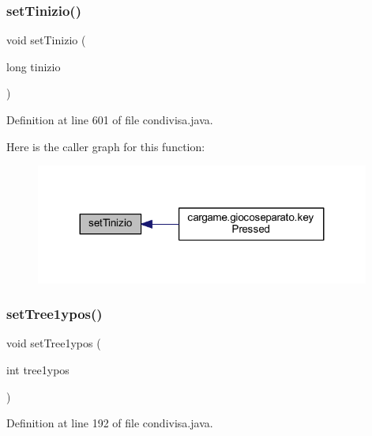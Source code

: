 \subsubsection{\texorpdfstring{set\+Tinizio()}{setTinizio()}}
{\footnotesize\ttfamily void set\+Tinizio (\begin{DoxyParamCaption}\item[{long}]{tinizio }\end{DoxyParamCaption})}



Definition at line 601 of file condivisa.\+java.

Here is the caller graph for this function\+:
\nopagebreak
\begin{figure}[H]
\begin{center}
\leavevmode
\includegraphics[width=311pt]{classcargame_1_1condivisa_a062a34ec0119afcbcc5f60b70c27cef3_icgraph}
\end{center}
\end{figure}
\mbox{\label{classcargame_1_1condivisa_a8ef6dcab42d241a285e397ac0734cf75}} 
\subsubsection{\texorpdfstring{set\+Tree1ypos()}{setTree1ypos()}}
{\footnotesize\ttfamily void set\+Tree1ypos (\begin{DoxyParamCaption}\item[{int}]{tree1ypos }\end{DoxyParamCaption})}



Definition at line 192 of file condivisa.\+java.

\mbox{\label{classcargame_1_1condivisa_a9c27a4ce9c3d7df4eb427e695f150c98}} 
